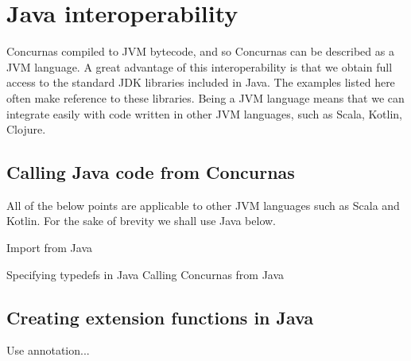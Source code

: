 \documentclass[index]{subfiles}
\begin{document}
	\chapter[Java interoperability]{Java interoperability}

Concurnas compiled to JVM bytecode, and so Concurnas can be described as a JVM language. A great advantage of this interoperability is that we obtain full access to the standard JDK libraries included in Java. The examples listed here often make reference to these libraries. Being a JVM language means that we can integrate easily with code written in other JVM languages, such as Scala, Kotlin, Clojure.

\section{Calling Java code from Concurnas}


All of the below points are applicable to other JVM languages such as Scala and Kotlin. For the sake of brevity we shall use Java below.

Import from Java


Specifying typedefs in Java
Calling Concurnas from Java
\section{Creating extension functions in Java}

Use annotation...
\end{document}
